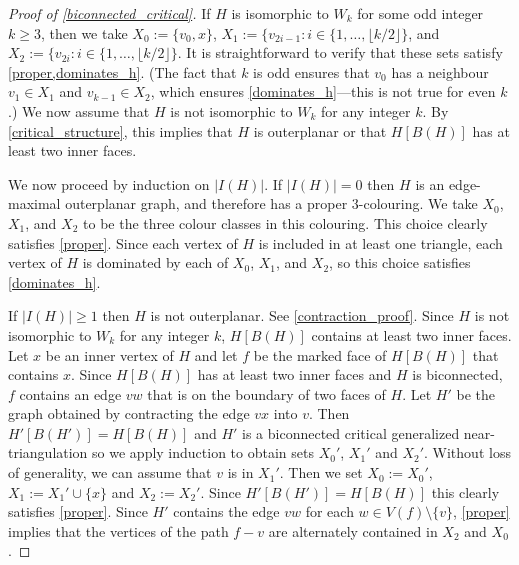 \documentclass[a4paper,UKenglish,cleveref, autoref, thm-restate]{lipics-v2021}
\begin{document}
\begin{proof}[Proof of \cref{biconnected_critical}]
  If $H$ is isomorphic to $W_k$ for some odd integer $k\ge 3$, then we take $X_0:=\{v_0, x\}$, $X_1:=\{v_{2i-1}:i\in\{1,\ldots,\lfloor k/2\rfloor\}$, and $X_2:=\{v_{2i}:i\in\{1,\ldots,\lfloor k/2\rfloor\}$.  It is straightforward to verify that these sets satisfy \cref{proper,dominates_h}.  (The fact that $k$ is odd ensures that $v_0$ has a neighbour $v_1\in X_1$ and $v_{k-1}\in X_2$, which ensures \cref{dominates_h}---this is not true for even $k$.)   We now assume that $H$ is not isomorphic to $W_k$ for any integer $k$.  By \cref{critical_structure}, this implies that $H$ is outerplanar or that $H[B(H)]$ has at least two inner faces.

  We now proceed by induction on $|I(H)|$.  If $|I(H)|=0$ then $H$ is an edge-maximal outerplanar graph, and therefore has a proper $3$-colouring.  We take $X_0$, $X_1$, and $X_2$ to be the three colour classes in this colouring.  This choice clearly satisfies \cref{proper}. Since each vertex of $H$ is included in at least one triangle, each vertex of $H$ is dominated by each of $X_0$, $X_1$, and $X_2$, so this choice satisfies \cref{dominates_h}.

  If $|I(H)|\ge 1$ then $H$ is not outerplanar.  See \cref{contraction_proof}.  Since $H$ is not isomorphic to $W_k$ for any integer $k$, $H[B(H)]$ contains at least two inner faces.  Let $x$ be an inner vertex of $H$ and let $f$ be the marked face of $H[B(H)]$ that contains $x$.
  Since $H[B(H)]$ has at least two inner faces and $H$ is biconnected, $f$ contains an edge $vw$ that is on the boundary of two faces of $H$.  Let $H'$ be the graph obtained by contracting the edge $vx$ into $v$. Then $H'[B(H')]=H[B(H)]$ and $H'$ is a biconnected critical generalized near-triangulation so we apply induction to obtain sets $X_0'$, $X_1'$ and $X_2'$.  Without loss of generality, we can assume that $v$ is in $X_1'$.  Then we set $X_0:=X_0'$, $X_1:=X_1'\cup\{x\}$ and $X_2:=X_2'$. Since $H'[B(H')]=H[B(H)]$ this clearly satisfies \cref{proper}.  Since $H'$ contains the edge $vw$ for each $w\in V(f)\setminus\{v\}$, \cref{proper} implies that the vertices of the path $f-v$ are alternately contained in $X_2$ and $X_0$.


\end{proof}
\end{document}
